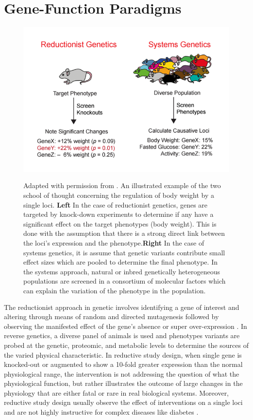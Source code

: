 \documentclass[a4paper,11pt,twoside]{book}
\begin{document}
	\section{Gene-Function Paradigms}
	
	\begin{figure}[ht]
		\centering
		\includegraphics[width=\linewidth]{1.Introduction_Figures/Reductionnist_genetics.PNG}
		\label{Reductionist vs. Systems Genetics}
		\caption{Adapted with permission from \citep{Williams2014Thesis}. An illustrated example of the two school of thought concerning the regulation of body weight by a single loci. \textbf{Left} In the case of reductionist genetics, genes are targeted by knock-down experiments to determine if any have a significant effect on the target phenotypes (body weight). This is done with the assumption that there is a strong direct link between the loci's expression and the phenotype.\textbf{Right} In the case of systems genetics, it is assume that genetic variants contribute small effect sizes which are pooled to determine the final phenotype. In the systems approach, natural or inbred genetically heterogeneous populations are screened in a consortium of molecular factors which can explain the variation of the phenotype in the population.}
	\end{figure}
	
	The reductionist approach in genetic involves identifying a gene of interest and altering through means of random and directed mutagenesis followed by observing the manifested effect of the gene's absence or super over-expression \citep{Williams2015TheAnalysis} . In reverse genetics, a diverse panel of animals is used and phenotypes variants are probed at the genetic, proteomic, and metabolic levels to determine the sources of the varied physical characteristic. In reductive study design, when single gene is knocked-out or augmented to show a 10-fold greater expression than the normal physiological range, the intervention is not addressing the question of what the physiological function, but rather illustrates the outcome of large changes in the physiology that are either fatal or rare in real biological systems. Moreover, reductive study design usually observe the effect of interventions on a single  loci and are not highly instructive for complex diseases like diabetes \citep{Williams2015TheAnalysis}.
	
\end{document}
